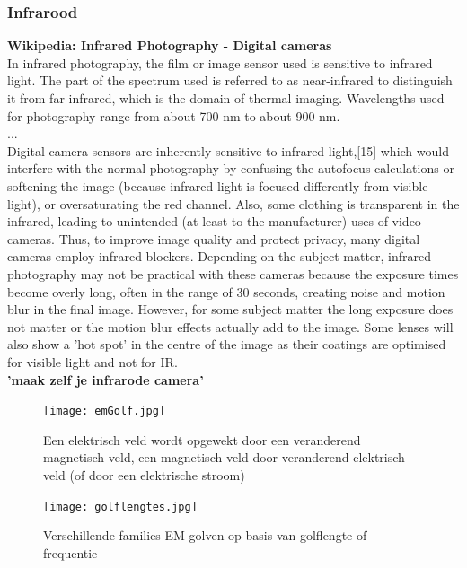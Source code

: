 \documentclass[11pt]{article}
\begin{document}
\subsubsection{Infrarood}


\textbf{Wikipedia: Infrared Photography - Digital cameras} \\

In infrared photography, the film or image sensor used is sensitive to infrared light. The part of the spectrum used is referred to as near-infrared to distinguish it from far-infrared, which
is the domain of thermal imaging. Wavelengths used for photography range from about 700 nm to about 900 nm. \\
... \\
Digital camera sensors are inherently sensitive to infrared light,[15] which would interfere with the normal photography by confusing the autofocus calculations or softening the image (because infrared light is focused differently from visible light), or oversaturating the red channel. Also, some clothing is transparent in the infrared, leading to unintended (at least to the manufacturer) uses of video cameras. Thus, to improve image quality and protect privacy, many digital cameras employ infrared blockers. Depending on the subject matter, infrared photography may not be practical with these cameras because the exposure times become overly long, often in the range of 30 seconds, creating noise and motion blur in the final image. However, for some subject matter the long exposure does not matter or the motion blur effects actually add to the image. Some lenses will also show a 'hot spot' in the centre of the image as their coatings are optimised for visible light and not for IR.\\

\textbf{'maak zelf je infrarode camera'}

\begin{figure}[h]
\begin{center}
\texttt{[image: emGolf.jpg]}
\caption{Een elektrisch veld wordt opgewekt door een veranderend magnetisch veld, een magnetisch veld door veranderend elektrisch veld (of door een elektrische stroom)}
\end{center}
\end{figure}


\begin{figure}[h]
\begin{center}
\texttt{[image: golflengtes.jpg]}
\caption{Verschillende families EM golven op basis van golflengte of frequentie}
\end{center}
\end{figure}
\end{document}
